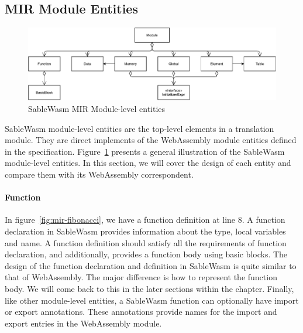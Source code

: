 \subsection{MIR Module Entities}

\begin{figure}
  \centering
  \includegraphics[width=\textwidth]{Images/4.MIR/module.pdf}
  \caption{SableWasm MIR Module-level entities}
  \label{fig:sablewasm-mir-module}
\end{figure}

SableWasm module-level entities are the top-level elements in a translation module. They are direct implements of the WebAssembly module entities defined in the specification. Figure~\ref{fig:sablewasm-mir-module} presents a general illustration of the SableWasm module-level entities. In this section, we will cover the design of each entity and compare them with its WebAssembly correspondent. 

\paragraph{Function}
In figure~\ref{fig:mir-fibonacci}, we have a function definition at line 8. A function declaration in SableWasm provides information about the type, local variables and name. A function definition should satisfy all the requirements of function declaration, and additionally, provides a function body using basic blocks. The design of the function declaration and definition in SableWasm is quite similar to that of WebAssembly. The major difference is how to represent the function body. We will come back to this in the later sections within the chapter. Finally, like other module-level entities, a SableWasm function can optionally have import or export annotations. These annotations provide names for the import and export entries in the WebAssembly module. 

